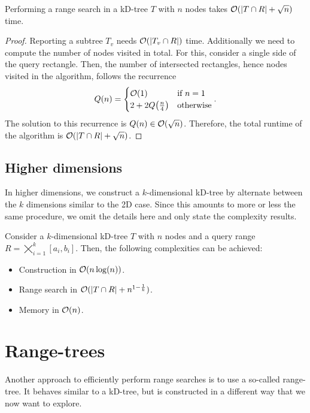         \begin{theorem}
            Performing a range search in a kD-tree $T$ with $n$ nodes takes $\mathcal{O}(\vert T \cap R \vert + \sqrt{n})$ time.
        \end{theorem}
        \begin{proof}
            Reporting a subtree $T_v$ needs $\mathcal{O}(\vert T_v \cap R \vert)$ time. Additionally we need to compute the number of nodes visited in total. For this, consider a single side of the query rectangle. Then, the number of intersected rectangles, hence nodes visited in the algorithm, follows the recurrence 
            $$Q(n) = \begin{cases} \mathcal{O}(1) & \text{if } n = 1 \\ 2 + 2Q\!\left( \frac{n}{4} \right) & \text{otherwise} \end{cases} .$$
            The solution to this recurrence is $Q(n) \in \mathcal{O}(\sqrt{n})$. Therefore, the total runtime of the algorithm is $\mathcal{O}(\vert T \cap R \vert + \sqrt{n})$. 
        \end{proof}

    \subsection{Higher dimensions}
        In higher dimensions, we construct a $k$-dimensional kD-tree by alternate between the $k$ dimensions similar to the 2D case. Since this amounts to more or less the same procedure, we omit the details here and only state the complexity results.

        \begin{proposition}
            Consider a $k$-dimensional kD-tree $T$ with $n$ nodes and a query range $R = \bigtimes_{i = 1}^{k} [a_i, b_i]$. Then, the following complexities can be achieved:
            \begin{itemize}[itemsep=-3pt]
                \item Construction in $\mathcal{O}(n\log(n))$.
                \item Range search in $\mathcal{O}(\vert T \cap R \vert + n^{1 - \frac{1}{k}})$.
                \item Memory in $\mathcal{O}(n)$.
            \end{itemize}
        \end{proposition}

\section{Range-trees}
    Another approach to efficiently perform range searches is to use a so-called range-tree. It behaves similar to a kD-tree, but is constructed in a different way that we now want to explore. 

